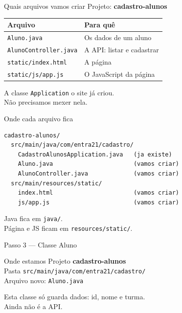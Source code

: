 \documentclass[aspectratio=169,11pt]{beamer}
\newcommand{\onde}[1]{%
  \begin{block}{Onde estamos}
    #1
  \end{block}
}
\begin{document}
\begin{frame}{Quais arquivos vamos criar}
  Projeto: \textbf{cadastro-alunos}

  \vspace{0.4em}
  \begin{center}
  \begin{tabular}{ll}
    \toprule
    Arquivo & Para quê \\
    \midrule
    \texttt{Aluno.java} & Os dados de um aluno \\
    \texttt{AlunoController.java} & A API: listar e cadastrar \\
    \texttt{static/index.html} & A página \\
    \texttt{static/js/app.js} & O JavaScript da página \\
    \bottomrule
  \end{tabular}
  \end{center}

  \vspace{0.5em}
  A classe \texttt{Application} o site já criou.\\
  Não precisamos mexer nela.
\end{frame}

\begin{frame}[fragile]{Onde cada arquivo fica}
\begin{lstlisting}[basicstyle=\ttfamily\footnotesize]
cadastro-alunos/
  src/main/java/com/entra21/cadastro/
    CadastroAlunosApplication.java   (ja existe)
    Aluno.java                       (vamos criar)
    AlunoController.java             (vamos criar)
  src/main/resources/static/
    index.html                       (vamos criar)
    js/app.js                        (vamos criar)
\end{lstlisting}

  Java fica em \texttt{java/}.\\
  Página e JS ficam em \texttt{resources/static/}.
\end{frame}

\begin{frame}[fragile]{Passo 3 --- Classe Aluno}
  \onde{Projeto \textbf{cadastro-alunos}\\
        Pasta \texttt{src/main/java/com/entra21/cadastro/}\\
        Arquivo novo: \texttt{Aluno.java}}

  Esta classe só guarda dados: id, nome e turma.\\
  Ainda não é a API.
\end{frame}
\end{document}
